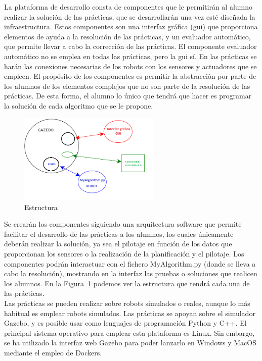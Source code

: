 La plataforma de desarrollo consta de componentes que le permitirán al alumno realizar la solución de las prácticas, que se desarrollarán una vez esté diseñada la infraestructura. Estos componentes son una interfaz gráfica (\acrshort{gui}) que proporciona elementos de ayuda a la resolución de las prácticas, y un evaluador automático, que permite llevar a cabo la corrección de las prácticas. El componente evaluador automático no se emplea en todas las prácticas, pero la \acrshort{gui} sí. En las prácticas se harán las conexiones necesarias de los robots con los sensores y actuadores que se empleen. El propósito de los componentes es permitir la abstracción por parte de los alumnos de los elementos complejos que no son parte de la resolución de las prácticas. De esta forma, el alumno lo único que tendrá que hacer es programar la solución de cada algoritmo que se le propone.
\begin{figure}[H]
  \begin{center}
    \includegraphics[width=0.6\textwidth]{figures/Introduccion/estructura.png}
		\caption{Estructura}
		\label{fig.estructura}
		\end{center}
\end{figure}

Se crearán los componentes siguiendo una arquitectura software que permite facilitar el desarrollo de las prácticas a los alumnos, los cuales únicamente deberán realizar la solución, ya sea el pilotaje en función de los datos que proporcionan los sensores  o la realización de la planificación y el pilotaje. Los componentes podrán interactuar con el fichero MyAlgorithm.py (donde se lleva a cabo la resolución), mostrando en la interfaz las pruebas o soluciones que realicen los alumnos. En la Figura~\ref{fig.estructura} podemos ver la estructura que tendrá cada una de las prácticas.\\

Las prácticas se pueden realizar sobre robots simulados o reales, aunque lo más habitual es emplear robots simulados. Las prácticas se apoyan sobre el simulador Gazebo, y es posible usar como lenguajes de programación Python y C++. El principal sistema operativo para emplear esta plataforma es Linux. Sin embargo, se ha utilizado la interfaz web Gazebo para poder lanzarlo en Windows y MacOS mediante el empleo de Dockers.\\

